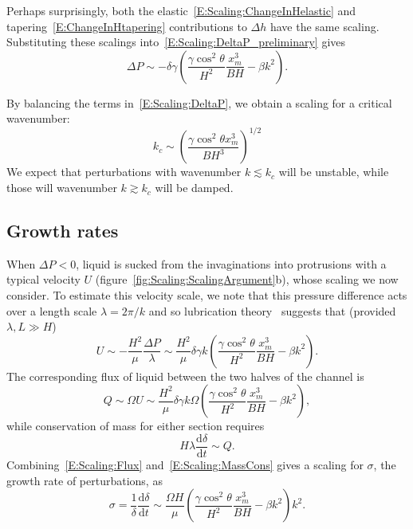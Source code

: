 \documentclass{jfm}
\newcommand{\dd}[2]{\frac{\mathrm{d} #1}{\mathrm{d} #2}}
\begin{document}
Perhaps surprisingly, both the elastic~\eqref{E:Scaling:ChangeInHelastic} and tapering~\eqref{E:ChangeInHtapering} contributions to $\Delta h$ have the same scaling. Substituting these scalings into~\eqref{E:Scaling:DeltaP_preliminary} gives
\begin{equation}\label{E:Scaling:DeltaP}
\Delta P \sim -\delta \gamma \left(\frac{\gamma \cos^2 \theta}{H^2}\frac{ x_m^3}{B H} - \beta k^2\right).
\end{equation}

By balancing the terms in~\eqref{E:Scaling:DeltaP}, we obtain
a scaling for a critical wavenumber:
\begin{equation}\label{E:Scaling:CriticalWavenumber}
k_c \sim  \left(\frac{\gamma \cos^2 \theta x_m^3}{B H^3}\right)^{1/2}
\end{equation}
We expect that perturbations with wavenumber $k \lesssim k_c$ will be unstable, while those will wavenumber $k \gtrsim k_c$ will be damped. 

\subsection{Growth rates}
When $\Delta P < 0$, liquid is sucked from the invaginations into protrusions with a typical velocity $U$ (figure~\ref{fig:Scaling:ScalingArgument}b), whose scaling we now consider. To estimate this velocity scale, we note that this pressure difference acts over a length scale $\lambda = 2\pi/k$ and so lubrication theory~\citep{Leal2007} suggests that (provided $\lambda,L \gg H$)
\begin{equation}
U \sim -\frac{H^2}{\mu}\frac{\Delta P}{\lambda}\sim \frac{H^2}{\mu}  \delta \gamma k\left(\frac{\gamma \cos^2 \theta}{H^2}\frac{x_m^3}{B H} - \beta k^2\right).
\end{equation}
The corresponding flux of liquid between the two halves of the channel is
\begin{equation}\label{E:Scaling:Flux}
Q \sim \Omega U \sim\frac{H^2}{\mu}  \delta \gamma k \Omega\left(\frac{\gamma \cos^2 \theta}{H^2}\frac{ x_m^3}{B H} - \beta k^2\right),
\end{equation}
while conservation of mass for either section requires
\begin{equation}\label{E:Scaling:MassCons}
H \lambda \dd{\delta}{t} \sim Q.
\end{equation}
Combining~\eqref{E:Scaling:Flux} and~\eqref{E:Scaling:MassCons} gives a scaling for $\sigma$, the growth rate of perturbations, as
\begin{equation}\label{E:Scaling:amplitude_ode}
\sigma = \frac{1}{\delta} \dd{\delta}{t} \sim \frac{\Omega H}{\mu}\left(\frac{\gamma \cos^2 \theta}{H^2}\frac{x_m^3}{B H} - \beta k^2\right)k^2.
\end{equation}
\end{document}
